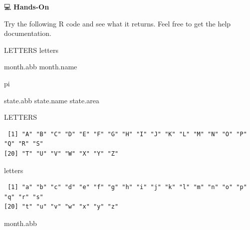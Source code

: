 \documentclass[
  letterpaper,
  DIV=11,
  numbers=noendperiod]{scrreprt}
\newenvironment{Shaded}{\begin{snugshade}}{\end{snugshade}}
\newcommand{\NormalTok}[1]{\textcolor[rgb]{0.00,0.23,0.31}{#1}}
\begin{document}
💻 \textbf{Hands-On}

Try the following R code and see what it returns. Feel free to get the
help documentation.

\begin{Shaded}
\begin{Highlighting}[]
\NormalTok{LETTERS}
\NormalTok{letters}

\NormalTok{month.abb}
\NormalTok{month.name}

\NormalTok{pi}

\NormalTok{state.abb}
\NormalTok{state.name}
\NormalTok{state.area}
\end{Highlighting}
\end{Shaded}

\begin{tcolorbox}[enhanced jigsaw, colbacktitle=quarto-callout-tip-color!10!white, opacitybacktitle=0.6, breakable, left=2mm, leftrule=.75mm, toprule=.15mm, toptitle=1mm, bottomtitle=1mm, colframe=quarto-callout-tip-color-frame, opacityback=0, coltitle=black, arc=.35mm, titlerule=0mm, colback=white, bottomrule=.15mm, title=\textcolor{quarto-callout-tip-color}{\faLightbulb}\hspace{0.5em}{Answer}, rightrule=.15mm]

\begin{Shaded}
\begin{Highlighting}[]
\NormalTok{LETTERS}
\end{Highlighting}
\end{Shaded}

\begin{verbatim}
 [1] "A" "B" "C" "D" "E" "F" "G" "H" "I" "J" "K" "L" "M" "N" "O" "P" "Q" "R" "S"
[20] "T" "U" "V" "W" "X" "Y" "Z"
\end{verbatim}

\begin{Shaded}
\begin{Highlighting}[]
\NormalTok{letters}
\end{Highlighting}
\end{Shaded}

\begin{verbatim}
 [1] "a" "b" "c" "d" "e" "f" "g" "h" "i" "j" "k" "l" "m" "n" "o" "p" "q" "r" "s"
[20] "t" "u" "v" "w" "x" "y" "z"
\end{verbatim}

\begin{Shaded}
\begin{Highlighting}[]
\NormalTok{month.abb}
\end{Highlighting}
\end{Shaded}


\end{tcolorbox}
\end{document}
